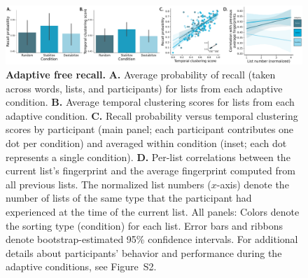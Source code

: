 \documentclass[11pt]{article}
\newcommand{\dynamicsAdaptive}{S2}
\begin{document}
\begin{figure} 
    \centering

    \includegraphics[width=\textwidth]{figures/adaptive_results}

        \caption{\textbf{Adaptive free recall.} \textbf{A.} Average probability
        of recall (taken across words, lists, and participants) for lists from
        each adaptive condition. \textbf{B.} Average temporal clustering scores
        for lists from each adaptive condition. \textbf{C.} Recall probability
        versus temporal clustering scores by participant (main panel; each
        participant contributes one dot per condition) and averaged within
        condition (inset; each dot represents a single condition). \textbf{D.}
        Per-list correlations between the current list's fingerprint and the
        average fingerprint computed from all previous lists. The normalized
        list numbers ($x$-axis) denote the number of lists of the same type
        that the participant had experienced at the time of the current list.
        All panels: Colors denote the sorting type (condition) for each list.
        Error bars and ribbons denote bootstrap-estimated 95\% confidence
        intervals. For additional details about participants' behavior and
        performance during the adaptive conditions, see
        Figure~\dynamicsAdaptive.}

    \label{fig:adaptive}
\end{figure}
\end{document}
